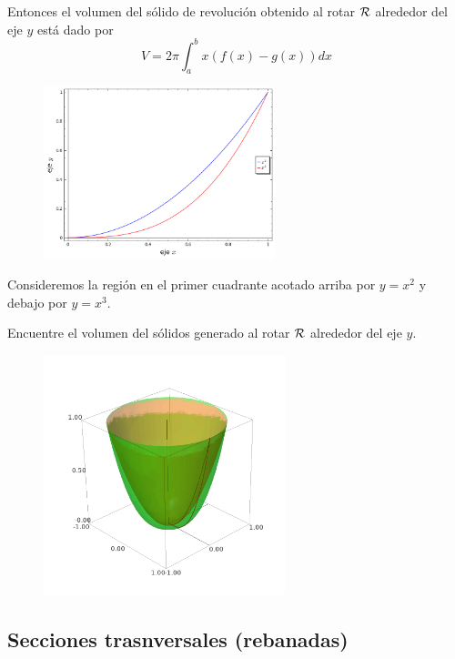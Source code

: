 Entonces el volumen del s\'olido de revoluci\'on obtenido al rotar $\mathcal{R}$ alrededor del eje $y$ está dado por
\[
 \label{FDC}
 \tag{FDC}
 V=2\pi\int_{a}^{b}x\left( f(x)-g(x) \right)dx
\]




\begin{problema}
\begin{figure}
 \centering
 \includegraphics[height=5cm,keepaspectratio=true]{./calculo/sage0507.png}
 \label{fig:sage:0507}
\end{figure}


 Consideremos la regi\'on en el primer cuadrante acotado arriba por $y=x^{2}$ y debajo por $y=x^{3}.$

Encuentre el volumen del s\'olidos generado al rotar $\mathcal{R}$ alrededor del eje $y.$
\end{problema}




\begin{figure}
 \centering
 \includegraphics[height=7cm,keepaspectratio=true]{./calculo/sage0508.png}
 \label{fig:sage:0508}
\end{figure}



\subsection{Secciones trasnversales (rebanadas)}


